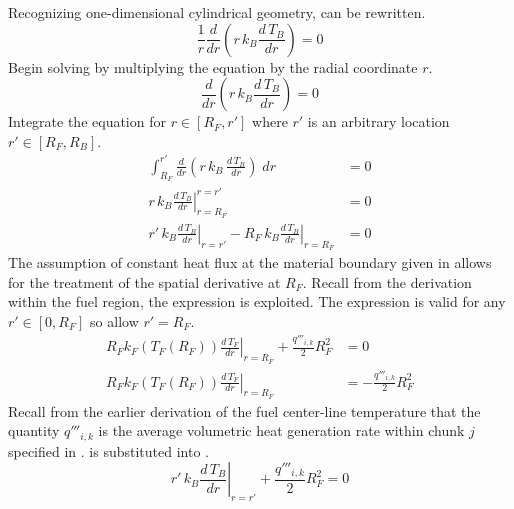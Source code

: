       Recognizing one-dimensional cylindrical geometry,  can 
      be rewritten.
      \begin{equation}
        \label{eq:tb_heat_conduction}
        \frac{1}{r} \frac{d}{dr} \left( r \, k_B \frac{d \, T_B}{dr} \right) = 0
      \end{equation}
      Begin solving  by multiplying the equation by
      the radial coordinate $r$.
      \begin{equation}
        \frac{d}{dr} \left( r \, k_B \frac{d \, T_B}{dr} \right) = 0
      \end{equation}
      Integrate the equation for $r \in[R_F,r']$ where $r'$ is an arbitrary
      location $r' \in [R_F,R_B]$.
      \begin{align}
        \int_{R_F}^{r'} \frac{d}{dr} \left( r\, k_B \, 
          \frac{d\,T_B}{dr} \right) \; dr &= 0\\
        \left. r\, k_B \frac{d\,T_B}{dr} \right|_{r=R_F}^{r=r'} &= 0 \\
        \label{eq:tf_first_integral}
        \left. r' \, k_B \frac{d\,T_B}{dr} \right|_{r=r'} - 
          \left. R_F \, k_B \frac{d\,T_B}{dr} \right|_{r=R_F} &= 0
      \end{align}
      The assumption of constant heat flux at the material boundary given in 
       allows for the treatment of the spatial 
      derivative at $R_F$. Recall from the derivation within the fuel region, 
      the expression  is exploited. The expression is valid 
      for any $r' \in [0,R_F]$ so allow $r'=R_F$.
      \begin{align}
        \left. R_F k_F(T_F(R_F)) \frac{d\,T_F}{dr} \right|_{r=R_F} + 
          \frac{q'''_{i,k}}{2} R_F^2 &= 0 \\
        \label{eq:surface_relation}
        \left. R_F k_F(T_F(R_F)) \frac{d\,T_F}{dr} \right|_{r=R_F} &= 
          - \frac{q'''_{i,k}}{2} R_F^2
      \end{align}
      Recall from the earlier derivation of the fuel center-line temperature 
      that the quantity $q'''_{i,k}$ is the average volumetric heat generation rate
      within chunk $j$ specified in .
       is substituted into
      .
      \begin{equation}
        \label{eq:tf_first_bc}
        \left. r' \, k_B \frac{d\,T_B}{dr} \right|_{r=r'} +
          \frac{q'''_{i,k}}{2} R_F^2 = 0
      \end{equation}
